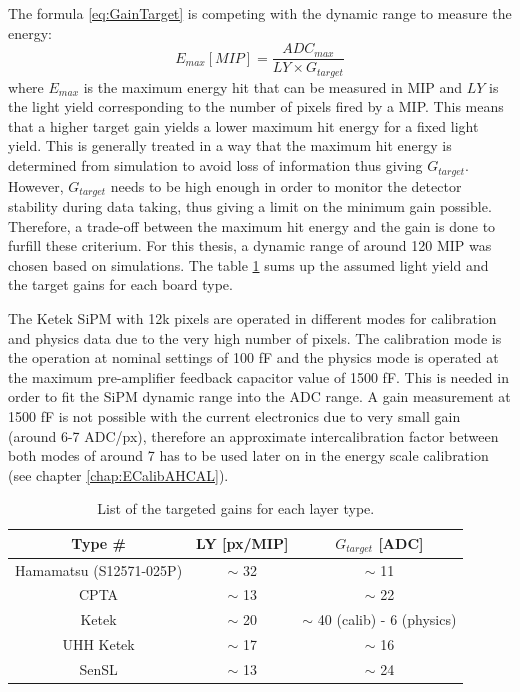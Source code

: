 The formula \ref{eq:GainTarget} is competing with the dynamic range to measure the energy:
\begin{equation}
  E_{max} [MIP] = \frac{ADC_{max}}{LY \times G_{target}}
\end{equation}
where $E_{max}$ is the maximum energy hit that can be measured in MIP and $LY$ is the light yield corresponding to the number of pixels fired by a MIP. This means that a higher target gain yields a lower maximum hit energy for a fixed light yield. This is generally treated in a way that the maximum hit energy is determined from simulation to avoid loss of information thus giving $G_{target}$. However, $G_{target}$ needs to be high enough in order to monitor the detector stability during data taking, thus giving a limit on the minimum gain possible. Therefore, a trade-off between the maximum hit energy and the gain is done to furfill these criterium. For this thesis, a dynamic range of around 120 MIP was chosen based on simulations. The table \ref{table:GainTarget_SiPM} sums up the assumed light yield and the target gains for each board type.

The Ketek SiPM with 12k pixels are operated in different modes for calibration and physics data due to the very high number of pixels. The calibration mode is the operation at nominal settings of 100 fF and the physics mode is operated at the maximum pre-amplifier feedback capacitor value of 1500 fF. This is needed in order to fit the SiPM dynamic range into the ADC range. A gain measurement at 1500 fF is not possible with the current electronics due to very small gain (around 6-7 ADC/px), therefore an approximate intercalibration factor between both modes of around 7 has to be used later on in the energy scale calibration (see chapter \ref{chap:ECalibAHCAL}).

\begin{table}[htb!]
  \centering
  \caption{List of the targeted gains for each layer type.}
  \label{table:GainTarget_SiPM}
  \begin{tabular}{@{} ccc @{}}
    \toprule
    Type \# & LY [px/MIP] & $G_{target}$ [ADC] \\
    \midrule
    Hamamatsu (S12571-025P) & $\sim$ 32 & $\sim$ 11\\
    CPTA & $\sim$ 13 & $\sim$ 22\\
    Ketek & $\sim$ 20 & $\sim$ 40 (calib) - 6 (physics)\\
    UHH Ketek & $\sim$ 17 & $\sim$ 16\\
    SenSL & $\sim$ 13 & $\sim$ 24\\
    \bottomrule
  \end{tabular}
\end{table}

